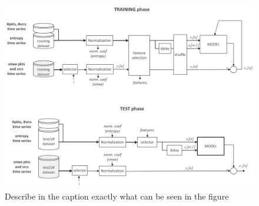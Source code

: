 \begin{figure}[h]
	\centering
	\includegraphics[width=0.95\linewidth]{graphics/modeling-example}
	\caption{Describe in the caption exactly what can be seen in the figure}
	\label{fig:modeling-example}
\end{figure}




\newpage